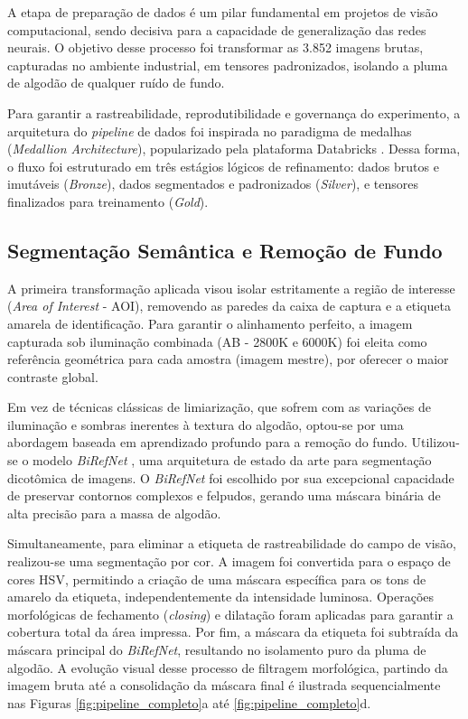
A etapa de preparação de dados é um pilar fundamental em projetos de visão computacional, sendo decisiva para a capacidade de generalização das redes neurais. O objetivo desse processo foi transformar as 3.852 imagens brutas, capturadas no ambiente industrial, em tensores padronizados, isolando a pluma de algodão de qualquer ruído de fundo. 

Para garantir a rastreabilidade, reprodutibilidade e governança do experimento, a arquitetura do \textit{pipeline} de dados foi inspirada no paradigma de medalhas (\textit{Medallion Architecture}), popularizado pela plataforma Databricks \cite{databricks_medallion}. Dessa forma, o fluxo foi estruturado em três estágios lógicos de refinamento: dados brutos e imutáveis (\textit{Bronze}), dados segmentados e padronizados (\textit{Silver}), e tensores finalizados para treinamento (\textit{Gold}).

\subsection{Segmentação Semântica e Remoção de Fundo}

    A primeira transformação aplicada visou isolar estritamente a região de interesse (\textit{Area of Interest} - AOI), removendo as paredes da caixa de captura e a etiqueta amarela de identificação. Para garantir o alinhamento perfeito, a imagem capturada sob iluminação combinada (AB - 2800K e 6000K) foi eleita como referência geométrica para cada amostra (imagem mestre), por oferecer o maior contraste global.

    Em vez de técnicas clássicas de limiarização, que sofrem com as variações de iluminação e sombras inerentes à textura do algodão, optou-se por uma abordagem baseada em aprendizado profundo para a remoção do fundo. Utilizou-se o modelo \textit{BiRefNet} \cite{zheng2024birefnet}, uma arquitetura de estado da arte para segmentação dicotômica de imagens. O \textit{BiRefNet} foi escolhido por sua excepcional capacidade de preservar contornos complexos e felpudos, gerando uma máscara binária de alta precisão para a massa de algodão.

    Simultaneamente, para eliminar a etiqueta de rastreabilidade do campo de visão, realizou-se uma segmentação por cor. A imagem foi convertida para o espaço de cores HSV, permitindo a criação de uma máscara específica para os tons de amarelo da etiqueta, independentemente da intensidade luminosa. Operações morfológicas de fechamento (\textit{closing}) e dilatação foram aplicadas para garantir a cobertura total da área impressa. Por fim, a máscara da etiqueta foi subtraída da máscara principal do \textit{BiRefNet}, resultando no isolamento puro da pluma de algodão. A evolução visual desse processo de filtragem morfológica, partindo da imagem bruta até a consolidação da máscara final é ilustrada sequencialmente nas Figuras \ref{fig:pipeline_completo}a até \ref{fig:pipeline_completo}d.


